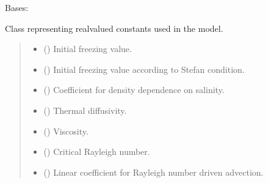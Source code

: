 \documentclass[a4paper,11pt,english,openany]{sphinxmanual}
\begin{document}
\begin{fulllineitems}
\label{\detokenize{api/spyice.parameters.real_constants:spyice.parameters.real_constants.RealConstants}}
\pysigstartsignatures
{}
\pysigstopsignatures
\sphinxAtStartPar
Bases: 

\sphinxAtStartPar
Class representing real\sphinxhyphen{}valued constants used in the model.
\begin{quote}\begin{description}
\begin{itemize}
\item {} 
\sphinxAtStartPar
{} () \textendash{} Initial freezing value.

\item {} 
\sphinxAtStartPar
{} () \textendash{} Initial freezing value according to Stefan condition.

\item {} 
\sphinxAtStartPar
{} () \textendash{} Coefficient for density dependence on salinity.

\item {} 
\sphinxAtStartPar
{} () \textendash{} Thermal diffusivity.

\item {} 
\sphinxAtStartPar
{} () \textendash{} Viscosity.

\item {} 
\sphinxAtStartPar
{} () \textendash{} Critical Rayleigh number.

\item {} 
\sphinxAtStartPar
{} () \textendash{} Linear coefficient for Rayleigh number driven advection.


\end{itemize}
\end{description}
\end{quote}
\end{fulllineitems}
\end{document}
